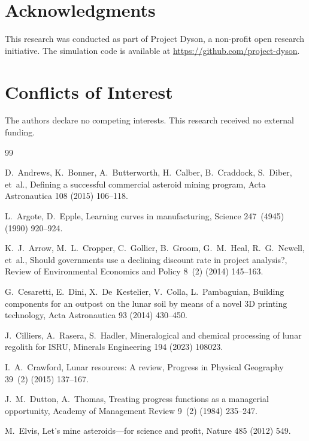 \documentclass[preprint,12pt]{elsarticle}
\begin{document}
\section*{Acknowledgments}

This research was conducted as part of Project Dyson, a non-profit open research initiative. The simulation code is available at \url{https://github.com/project-dyson}.

\section*{Conflicts of Interest}

The authors declare no competing interests. This research received no external funding.

\begin{thebibliography}{99}

D.~Andrews, K.~Bonner, A.~Butterworth, H.~Calber, B.~Craddock, S.~Diber, et~al.,
\newblock Defining a successful commercial asteroid mining program,
\newblock Acta Astronautica 108 (2015) 106--118.

L.~Argote, D.~Epple,
\newblock Learning curves in manufacturing,
\newblock Science 247~(4945) (1990) 920--924.

K.~J.~Arrow, M.~L.~Cropper, C.~Gollier, B.~Groom, G.~M.~Heal, R.~G.~Newell, et~al.,
\newblock Should governments use a declining discount rate in project analysis?,
\newblock Review of Environmental Economics and Policy 8~(2) (2014) 145--163.

G.~Cesaretti, E.~Dini, X.~De~Kestelier, V.~Colla, L.~Pambaguian,
\newblock Building components for an outpost on the lunar soil by means of a novel 3D printing technology,
\newblock Acta Astronautica 93 (2014) 430--450.

J.~Cilliers, A.~Rasera, S.~Hadler,
\newblock Mineralogical and chemical processing of lunar regolith for ISRU,
\newblock Minerals Engineering 194 (2023) 108023.

I.~A.~Crawford,
\newblock Lunar resources: A review,
\newblock Progress in Physical Geography 39~(2) (2015) 137--167.

J.~M.~Dutton, A.~Thomas,
\newblock Treating progress functions as a managerial opportunity,
\newblock Academy of Management Review 9~(2) (1984) 235--247.

M.~Elvis,
\newblock Let's mine asteroids---for science and profit,
\newblock Nature 485 (2012) 549.


\end{thebibliography}
\end{document}
